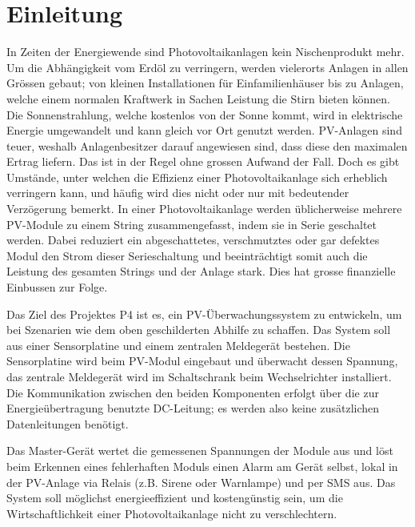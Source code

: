 \chapter{Einleitung}
\label{chap:einleitung}

In Zeiten der Energiewende  sind Photovoltaikanlagen kein Nischenprodukt mehr.
Um die Abh\"angigkeit vom Erd\"ol  zu verringern, werden vielerorts Anlagen in
allen Gr\"ossen  gebaut; von kleinen Installationen  f\"ur Einfamilienh\"auser
bis zu Anlagen,  welche einem normalen Kraftwerk in Sachen  Leistung die Stirn
bieten k\"onnen.  Die  Sonnenstrahlung, welche kostenlos von  der Sonne kommt,
wird  in elektrische  Energie  umgewandelt  und kann  gleich  vor Ort  genutzt
werden.   PV-Anlagen sind  teuer,  weshalb  Anlagenbesitzer darauf  angewiesen
sind,  dass diese  den maximalen  Ertrag liefern. Das  ist in  der Regel  ohne
grossen  Aufwand  der  Fall.   Doch  es gibt  Umst\"ande,  unter  welchen  die
Effizienz  einer  Photovoltaikanlage  sich   erheblich  verringern  kann,  und
h\"aufig wird dies  nicht oder nur mit bedeutender  Verz\"ogerung bemerkt.  In
einer  Photovoltaikanlage werden  \"ublicherweise mehrere  PV-Module zu  einem
String zusammengefasst, indem sie  in Serie geschaltet werden. Dabei reduziert
ein abgeschattetes,  verschmutztes oder  gar defektes  Modul den  Strom dieser
Serieschaltung  und  beeintr\"achtigt somit  auch  die  Leistung des  gesamten
Strings und der Anlage stark. Dies hat grosse finanzielle Einbussen zur Folge.

Das Ziel des  Projektes P4 ist es, ein  PV-\"Uberwachungssystem zu entwickeln,
um bei  Szenarien wie dem  oben geschilderten Abhilfe zu  schaffen. Das System
soll aus  einer Sensorplatine  und einem zentralen  Meldeger\"at bestehen. Die
Sensorplatine wird  beim PV-Modul  eingebaut und \"uberwacht  dessen Spannung,
das   zentrale  Meldeger\"at   wird  im   Schaltschrank  beim   Wechselrichter
installiert. Die Kommunikation zwischen den  beiden Komponenten erfolgt \"uber
die  zur  Energie\"ubertragung  benutzte  DC-Leitung;  es  werden  also  keine
zus\"atzlichen Datenleitungen ben\"otigt.

Das Master-Ger\"at wertet die gemessenen  Spannungen der Module aus und l\"ost
beim Erkennen eines  fehlerhaften Moduls einen Alarm am  Ger\"at selbst, lokal
in der PV-Anlage via Relais (z.B. Sirene oder Warnlampe) und per SMS aus.  Das
System  soll m\"oglichst  energieeffizient  und kosteng\"unstig  sein, um  die
Wirtschaftlichkeit einer Photovoltaikanlage nicht zu verschlechtern.


